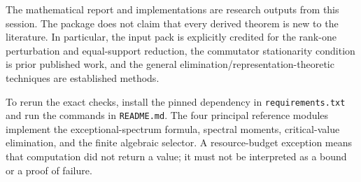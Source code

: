 \documentclass[11pt]{article}
\theoremstyle{definition}\newtheorem{definition}[theorem]{Definition}
\theoremstyle{remark}\newtheorem{remark}[theorem]{Remark}
\begin{document}
The mathematical report and implementations are research outputs from this session. The package does not claim that every derived theorem is new to the literature. In particular, the input pack is explicitly credited for the rank-one perturbation and equal-support reduction, the commutator stationarity condition is prior published work, and the general elimination/representation-theoretic techniques are established methods.

To rerun the exact checks, install the pinned dependency in \texttt{requirements.txt} and run the commands in \texttt{README.md}. The four principal reference modules implement the exceptional-spectrum formula, spectral moments, critical-value elimination, and the finite algebraic selector. A resource-budget exception means that computation did not return a value; it must not be interpreted as a bound or a proof of failure.
\end{document}
